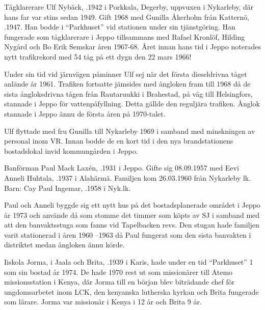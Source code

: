 
Tågklarerare Ulf Nybäck, .1942 i Porkkala, Degerby, uppvuxen i Nykarleby, där hans far var stins sedan 1949. Gift 1968 med Gunilla Åkerholm från Katternö, .1947. Han bodde i ``Parkhuset'' vid stationen under sin tjänstgöring. Han fungerade som tågklarerare i Jeppo tillsammans med Rafael Kronlöf, Hilding Nygård och Bo Erik Semskar åren 1967-68. Året innan hans tid i Jeppo noterades nytt trafikrekord med 54 tåg på ett dygn den 22 mars 1966!

Under sin tid vid järnvägen påminner Ulf sej när det första dieseldrivna tåget anlände år 1961. Trafiken fortsatte jämsides med ångloken fram till 1968 då de sista ångloksdrivna tågen från Rautaruukki i Brahestad, på väg till Helsingfors, stannade i Jeppo för vattenpåfyllning. Detta gällde den reguljära trafiken. Ånglok stannade i Jeppo ännu de första åren på 1970-talet.

Ulf flyttade med fru Gunilla till Nykarleby 1969 i samband med minskningen av personal inom VR. Innan bodde de en kort tid i den nya brandstationens bostadslokal invid kommungården i Jeppo.


Banförman Paul Mack Laxén, .1931 i Jeppo. Gifte sig 08.09.1957 med Eevi Anneli Huhtala, .1937 i Alahärmä.  Familjen kom 26.03.1960 från Nykarleby lk.
Barn: Cay Paul Ingemar, .1958 i Nyk.lk.

Paul och Anneli byggde sig ett nytt hus på det bostadsplanerade området i Jeppo år 1973  och använde då som stomme det timmer som köpts av SJ i samband med att den banvaktsstuga som fanns vid Tapelbacken revs. Den stugan hade familjen varit stationerad i åren 1960 –1963 då Paul fungerat som den sista banvakten i distriktet medan ångloken ännu körde.


Iiskola Jorma,  i Jaala och Brita, .1939 i Karis, hade under en tid ``Parkhuset'' 1 som sin bostad år 1974. De hade 1970 rest ut som missionärer till Atemo missionsstation i Kenya, där Jorma till en början blev biträdande chef för ungdomsarbetet inom LCK, den kenyanska lutherska kyrkan och Brita fungerade som lärare. Jorma var missionär i Kenya i 12 år och Brita 9 år.









